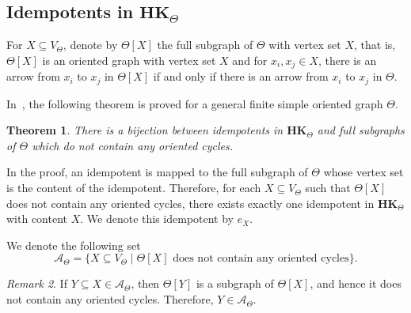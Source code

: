 \documentclass[pdflatex,sn-mathphys-num]{sn-jnl}
\newcommand{\hk}{\mathbf{HK}_{\Theta}}
\newtheorem{theorem}{Theorem}[section]
\theoremstyle{definition}
\theoremstyle{remark}
\newtheorem{remark}[theorem]{Remark}
\begin{document}
\subsection{Idempotents in $\hk$}

For $X \subseteq V_{\Theta}$, denote by $\Theta[X]$ the full subgraph of $\Theta$ with vertex set $X$, that is,
$\Theta[X]$ is an oriented graph with vertex set $X$ and for $x_i, x_j \in X$, there is an arrow from $x_i$ to $x_j$ in $\Theta[X]$ if and only if there is an arrow from $x_i$ to $x_j$ in $\Theta$.

In~\cite[Theorem 3.6]{forsberg2017}, the following theorem is proved for a general finite simple oriented graph $\Theta$.
\begin{theorem}\label{theorem:forsberg}
   There is a bijection between idempotents in $\hk$ and full subgraphs of $\Theta$ which do not contain any oriented cycles.
\end{theorem}
In the proof, an idempotent is mapped to the full subgraph of $\Theta$ whose vertex set is the content of the idempotent.
Therefore, for each $X \subseteq V_{\Theta}$ such that $\Theta[X]$ does not contain any oriented cycles, there exists exactly one idempotent in $\hk$ with content $X$.
We denote this idempotent by $e_X$.

We denote the following set
\[
\mathcal{A}_{\Theta} = \{X \subseteq V_{\Theta} \mid \Theta[X] \text{ does not contain any oriented cycles}\}.
\]

\begin{remark}\label{A-theta}
   If $Y \subseteq X \in \mathcal{A}_{\Theta}$, then $\Theta[Y]$ is a subgraph of $\Theta[X]$, and hence it does not contain any oriented cycles.
   Therefore, $Y \in \mathcal{A}_{\Theta}$.
\end{remark}
\end{document}
